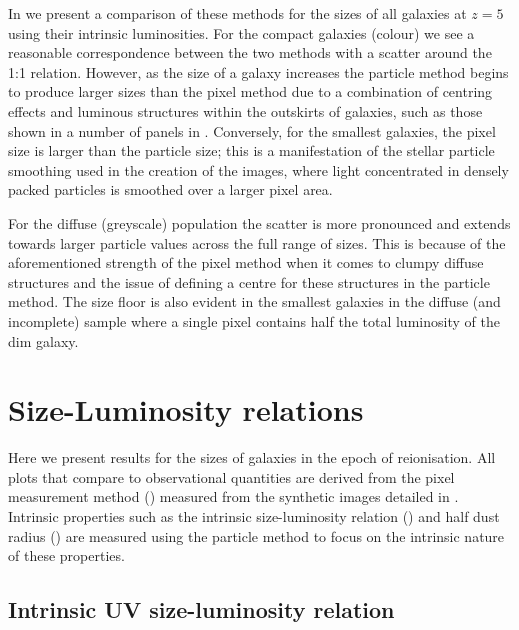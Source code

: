 In  we present a comparison of these methods for the sizes of all galaxies at $z=5$ using their intrinsic luminosities. For the compact galaxies (colour) we see a reasonable correspondence between the two methods with a scatter around the 1:1 relation. However, as the size of a galaxy increases the particle method begins to produce larger sizes than the pixel method due to a combination of centring effects and luminous structures within the outskirts of galaxies, such as those shown in a number of panels in . Conversely, for the smallest galaxies, the pixel size is larger than the particle size; this is a manifestation of the stellar particle smoothing used in the creation of the images, where light concentrated in densely packed particles is smoothed over a larger pixel area. 

For the diffuse (greyscale) population the scatter is more pronounced and extends towards larger particle values across the full range of sizes. This is because of the aforementioned strength of the pixel method when it comes to clumpy diffuse structures and the issue of defining a centre for these structures in the particle method. The size floor is also evident in the smallest galaxies in the diffuse (and incomplete) sample where a single pixel contains half the total luminosity of the dim galaxy. 

\section{Size-Luminosity relations}
\label{sec:size-lumin}


Here we present results for the sizes of galaxies in the epoch of reionisation. All plots that compare to observational quantities are derived from the pixel measurement method () measured from the synthetic images detailed in . Intrinsic properties such as the intrinsic size-luminosity relation () and half dust radius () are measured using the particle method to focus on the intrinsic nature of these properties.

\subsection{Intrinsic UV size-luminosity relation}
\label{sec:intrinsic}

